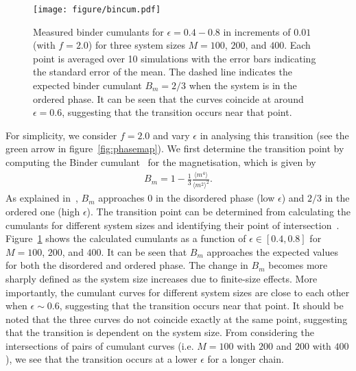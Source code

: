 \documentclass[12pt]{article}
\newcommand*{\DataFig}{/Users/MichaelChiang/Desktop/epigenetics_data/}
\begin{document}
\begin{figure}[h]
\centering
\texttt{[image: figure/bincum.pdf]}
\caption{Measured binder cumulants for $\epsilon = 0.4 - 0.8$ in increments of $0.01$ (with $f = 2.0$) for three system sizes $M = 100$, $200$, and $400$. Each point is averaged over 10 simulations with the error bars indicating the standard error of the mean. The dashed line indicates the expected binder cumulant $B_m = 2/3$ when the system is in the ordered phase. It can be seen that the curves coincide at around $\epsilon = 0.6$, suggesting that the transition occurs near that point.}
\label{fig:bincum}
\end{figure}
For simplicity, we consider $f = 2.0$ and vary $\epsilon$ in analysing this transition (see the green arrow in figure~\ref{fig:phasemap}). We first determine the transition point by computing the Binder cumulant~\cite{binder1981} for the magnetisation, which is given by
\begin{eqnarray}
B_m = 1 - \frac{1}{3}\frac{\langle m^4 \rangle}{\langle m^2 \rangle^2}.
\end{eqnarray}
As explained in~\cite{binder1981}, $B_m$ approaches $0$ in the disordered phase (low $\epsilon$) and $2/3$ in the ordered one (high $\epsilon$). The transition point can be determined from calculating the cumulants for different system sizes and identifying their point of intersection~\cite{binder2010}. Figure~\ref{fig:bincum} shows the calculated cumulants as a function of $\epsilon \in [0.4,0.8]$ for $M = 100$, $200$, and $400$. It can be seen that $B_m$ approaches the expected values for both the disordered and ordered phase. The change in $B_m$ becomes more sharply defined as the system size increases due to finite-size effects. More importantly, the cumulant curves for different system sizes are close to each other when $\epsilon \sim 0.6$, suggesting that the transition occurs near that point. It should be noted that the three curves do not coincide exactly at the same point, suggesting that the transition is dependent on the system size. From considering the intersections of pairs of cumulant curves (i.e. $M = 100$ with $200$ and $200$ with $400$), we see that the transition occurs at a lower $\epsilon$ for a longer chain.
\end{document}
